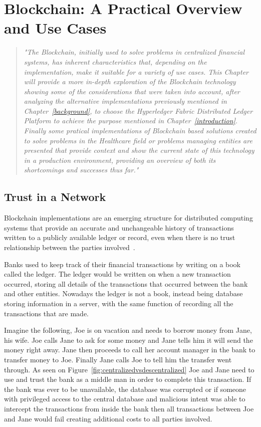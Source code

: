 \chapter{Blockchain: A Practical Overview and Use Cases}

\begin{quote} \emph{"The Blockchain, initially used to solve problems in
  centralized financial systems, has inherent characteristics that, depending
  on the implementation, make it suitable for a variety of use cases. This
  Chapter will provide a more in-depth exploration of the Blockchain technology
  showing some of the considerations that were taken into account, after
  analyzing the alternative implementations previously mentioned in
  Chapter~\ref{background}, to choose the Hyperledger Fabric Distributed Ledger
  Platform to achieve the purpose mentioned in Chapter~\ref{introduction}.
  Finally some pratical implementations of Blockchain based solutions created
  to solve problems in the Healthcare field or problems managing entities are
presented that provide context and show the current state of this technology in
a production environment, providing an overview of both its shortcomings and
successes thus far."} \end{quote}

\section{Trust in a Network}

Blockchain implementations are an emerging structure for distributed computing
systems that provide an accurate and unchangeable history of transactions
written to a publicly available ledger or record, even when there is no trust
relationship between the parties involved~\cite{Barclay2017}.

Banks used to keep track of their financial transactions by writing on a book
called the ledger. The ledger would be written on when a new transaction
occurred, storing all details of the transactions that occurred between the
bank and other entities. Nowadays the ledger is not a book, instead being
database storing information in a server, with the same function of recording
all the transactions that are made.

Imagine the following, Joe is on vacation and needs to borrow money from Jane,
his wife. Joe calls Jane to ask for some money and Jane tells him it will send
the money right away. Jane then proceeds to call her account manager in the
bank to transfer money to Joe. Finally Jane calls Joe to tell him the transfer
went through.  As seen on Figure~\ref{fig:centralizedvsdescentralized} Joe and
Jane need to use and trust the bank as a middle man in order to complete this
transaction. If the bank was ever to be unavailable, the database was corrupted
or if someone with  privileged access to the central database and malicious
intent was able to intercept the transactions from inside the bank then all
transactions between Joe and Jane would fail creating additional costs to all
parties involved. 

